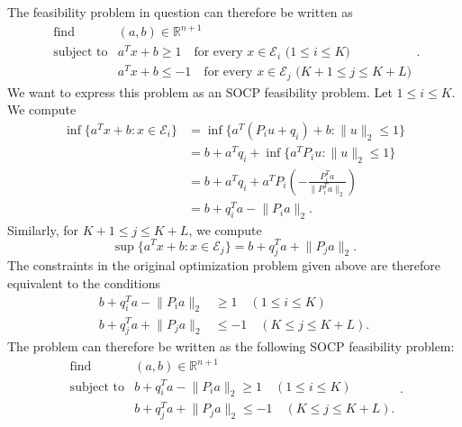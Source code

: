 \documentclass[letterpaper,12pt]{article}
\begin{document}
\begin{enumerate}
  The feasibility problem in question can therefore be written as
  \begin{equation*}
    \begin{array}{ll}
      \text{find} & (a, b) \in \mathbb{R}^{n+1} \\
      \text{subject to}
        &a^T x + b \geq 1
          \quad \text{for every $x \in \mathcal{E}_i$ ($1 \leq i \leq K$)} \\
        &a^T x + b \leq -1
          \quad \text{for every $x \in \mathcal{E}_j$ ($K+1 \leq j \leq K+L$)}
    \end{array}.
  \end{equation*}
  We want to express this problem as an SOCP feasibility problem. Let
  $1 \leq i \leq K$. We compute
  \begin{align*}
    \inf\{a^T x + b : x \in \mathcal{E}_i\}
      &= \inf\{a^T (P_iu + q_i) + b : \lVert u \rVert_2 \leq 1\} \\
      &= b + a^T q_i + \inf\{a^T P_iu : \lVert u \rVert_2 \leq 1\} \\
      &= b + a^T q_i
        + a^T P_i \left( -\frac{P_i^T a}{\lVert P_i^T a \rVert_2} \right) \\
      &= b + q_i^T a - \lVert P_i a \rVert_2.
  \end{align*}
  Similarly, for $K+1 \leq j \leq K+L$, we compute
  \begin{equation*}
    \sup\{a^T x + b : x \in \mathcal{E}_j\}
      = b + q_j^T a + \lVert P_j a \rVert_2.
  \end{equation*}
  The constraints in the original optimization problem given above are
  therefore equivalent to the conditions
  \begin{align*}
    b + q_i^T a - \lVert P_i a \rVert_2 &\geq 1 \quad (1 \leq i \leq K) \\
    b + q_j^T a + \lVert P_j a \rVert_2 &\leq -1 \quad (K \leq j \leq K+L).
  \end{align*}
  The problem can therefore be written as the following SOCP
  feasibility problem:
  \begin{equation*}
    \begin{array}{ll}
      \text{find} & (a, b) \in \mathbb{R}^{n+1} \\
      \text{subject to}
        &b + q_i^T a - \lVert P_i a \rVert_2 \geq 1 \quad (1 \leq i \leq K) \\
        &b + q_j^T a + \lVert P_j a \rVert_2 \leq -1 \quad (K \leq j \leq K+L).
    \end{array}.
  \end{equation*}


\end{enumerate}
\end{document}

